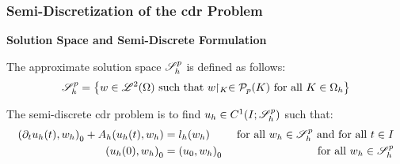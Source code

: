 \begin{frame}
    \frametitle{Semi-Discretization of the \acrshort{cdr} Problem}

    \vspace*{\fill}
    \begin{center}
        {\color{\accentcolor} \Large \textbf{Solution Space and Semi-Discrete Formulation}}
        \vspace*{0.25cm}

        \begin{minipage}{0.75\textwidth}
            \begin{definition}
                The approximate solution space $\mathscr{S}_h^p$ is defined as follows:
                \begin{align*}
                    \mathscr{S}_h^p = \left\{ w \in \mathscr{L}^{2}(\Omega) \text{ such that } w \!\!\restriction_{K} \in \mathcal{P}_{p}(K) \text{ for all } K \in \Omega_h \right\}
                \end{align*}
            \end{definition}
        \end{minipage}
    \end{center}

    \vspace*{\fill}

    \begin{center}
        \begin{minipage}{0.75\textwidth}
            \begin{definition}
                The semi-discrete \acrshort{cdr} problem is to find $u_h \in C^1(I; \mathscr{S}_h^p)$ such that:
                \begin{align*}
                    \left( \partial_t u_h(t), w_h \right)_0 + A_h(u_h(t), w_h) &= l_h(w_h) &\text{ for all } w_h \in \mathscr{S}_h^p \text{ and for all } t \in I \\
                    \left( u_h(0), w_h \right)_0 &= \left( u_0, w_h \right)_0 &\text{ for all } w_h \in \mathscr{S}_h^p
                \end{align*}
            \end{definition}
        \end{minipage}
    \end{center}
    \vspace*{\fill}
    
\end{frame}

